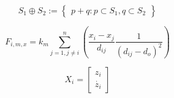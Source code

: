 \documentclass[twoside]{article}
\begin{document}
			
			
			\begin{equation}
			S_1 \oplus S_2 := \begin{Bmatrix}
			p+q : p \subset S_1, q \subset S_2
			\end{Bmatrix} 
			\end{equation}
			
			\begin{equation}
			F_{i,m,x} = k_m \sum_{j=1, j\neq{i}}^{n}\left({\frac{x_i - x_j}{{d_{ij}}} \frac{1}{\left(d_{ij} - d_o \right)^2} } \right)
			\end{equation}
			
			\begin{equation}
			X_i= \begin{bmatrix}
			z_i\\
			\dot{z_i}
			\end{bmatrix}
			\end{equation}
	
		
	
\end{document}
